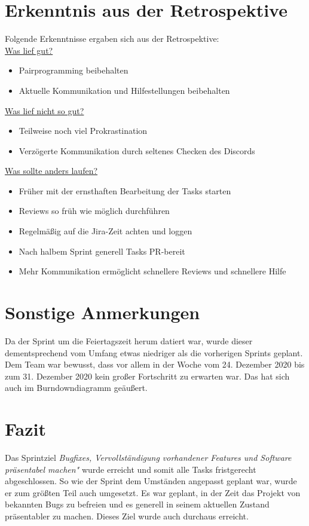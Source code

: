 \documentclass[12pt,a4paper, oneside]{article}
\begin{document}
    \section{Erkenntnis aus der Retrospektive}

    Folgende Erkenntnisse ergaben sich aus der Retrospektive:\\

    \underline{Was lief gut?}
    \begin{itemize}
        \item Pairprogramming beibehalten
        \item Aktuelle Kommunikation und Hilfestellungen beibehalten
        \\
    \end{itemize}

    \underline{Was lief nicht so gut?}
    \begin{itemize}
        \item Teilweise noch viel Prokrastination
        \item Verzögerte Kommunikation durch seltenes Checken des Discords
        \\
    \end{itemize}

    \underline{Was sollte anders laufen?}
    \begin{itemize}
        \item Früher mit der ernsthaften Bearbeitung der Tasks starten
        \item Reviews so früh wie möglich durchführen
        \item Regelmäßig auf die Jira-Zeit achten und loggen
        \item Nach halbem Sprint generell Tasks PR-bereit
        \item Mehr Kommunikation ermöglicht schnellere Reviews und schnellere Hilfe
    \end{itemize}

    \section{Sonstige Anmerkungen}

    Da der Sprint um die Feiertagszeit herum datiert war, wurde dieser dementsprechend vom Umfang etwas niedriger als die vorherigen Sprints geplant. Dem Team war bewusst, dass vor allem in der Woche vom 24. Dezember 2020 bis zum 31. Dezember 2020 kein großer Fortschritt zu erwarten war. Das hat sich auch im Burndowndiagramm geäußert.


    \section{Fazit}
    Das Sprintziel \textit{\glqq Bugfixes, Vervollständigung vorhandener Features und Software präsentabel machen"} wurde erreicht und somit alle Tasks fristgerecht abgeschlossen. So wie der Sprint dem Umständen angepasst geplant war, wurde er zum größten Teil auch umgesetzt. Es war geplant, in der Zeit das Projekt von bekannten Bugs zu befreien und es generell in seinem aktuellen Zustand präsentabler zu machen. Dieses Ziel wurde auch durchaus erreicht.
\end{document}
